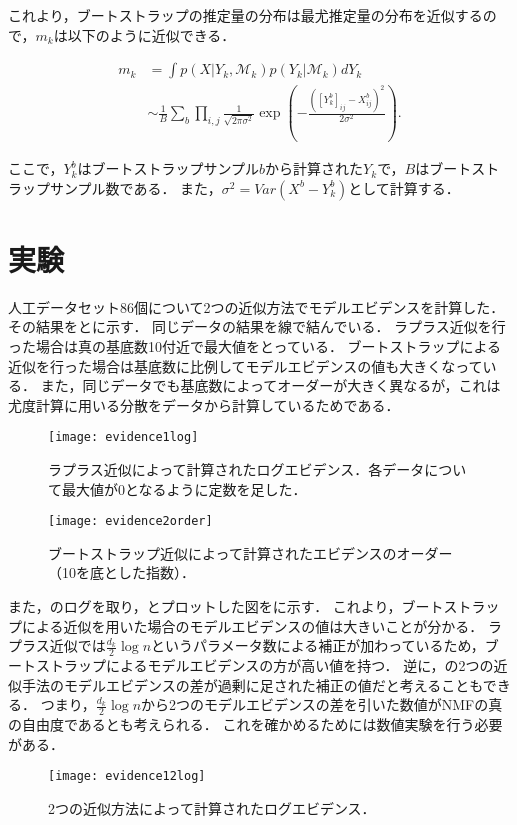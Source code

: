 これより，ブートストラップの推定量の分布は最尤推定量の分布を近似するので，$m_k$は以下のように近似できる．

\begin{align}
	m_k &= \int p(X | Y_k, \mathcal{M}_k) p(Y_k| \mathcal{M}_k) dY_k \\
	&\sim \frac{1}{B} \sum_b \prod_{i,j} \frac{1}{\sqrt{2 \pi \sigma^2}} \exp\left(-\frac{([Y_k^b]_{ij} - X^b_{ij})^2}{2 \sigma^2} \right).
	\label{eq:simm2}
\end{align}

ここで，$Y_k^b$はブートストラップサンプル$b$から計算された$Y_k$で，$B$はブートストラップサンプル数である．
また，$\sigma^2 = Var(X^b - Y^b_k)$として計算する．

\section{実験}
人工データセット86個について2つの近似方法でモデルエビデンスを計算した．
その結果をとに示す．
同じデータの結果を線で結んでいる．
ラプラス近似を行った場合は真の基底数10付近で最大値をとっている．
ブートストラップによる近似を行った場合は基底数に比例してモデルエビデンスの値も大きくなっている．
また，同じデータでも基底数によってオーダーが大きく異なるが，これは尤度計算に用いる分散をデータから計算しているためである．

\begin{figure}[htbp]
    \begin{minipage}{0.5\hsize}
			\begin{center}
					\texttt{[image: evidence1log]}
					\caption{ラプラス近似によって計算されたログエビデンス．各データについて最大値が0となるように定数を足した．}
					\label{fig:evidence1}
			\end{center}
		\end{minipage}
    \begin{minipage}{0.5\hsize}
			\begin{center}
					\texttt{[image: evidence2order]}
					\caption{ブートストラップ近似によって計算されたエビデンスのオーダー（10を底とした指数）．}
					\label{fig:evidence2}
			\end{center}
		\end{minipage}
\end{figure}

また，のログを取り，とプロットした図をに示す．
これより，ブートストラップによる近似を用いた場合のモデルエビデンスの値は大きいことが分かる．
ラプラス近似では$\frac{d_k}{2} \log n$というパラメータ数による補正が加わっているため，ブートストラップによるモデルエビデンスの方が高い値を持つ．
逆に，の2つの近似手法のモデルエビデンスの差が過剰に足された補正の値だと考えることもできる．
つまり，$\frac{d_k}{2} \log n$から2つのモデルエビデンスの差を引いた数値がNMFの真の自由度であるとも考えられる．
これを確かめるためには数値実験を行う必要がある．

\begin{figure}[htbp]
    \begin{center}
        \texttt{[image: evidence12log]}
        \caption{2つの近似方法によって計算されたログエビデンス．}
        \label{fig:evidence12}
    \end{center}
\end{figure}
